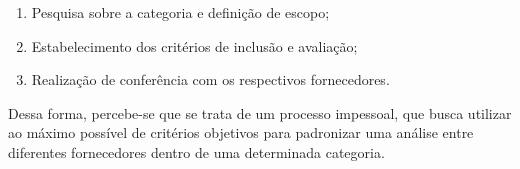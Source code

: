 \begin{enumerate}
    \item Pesquisa sobre a categoria e definição de escopo;
    \item Estabelecimento dos critérios de inclusão e avaliação;
    \item Realização de conferência com os respectivos fornecedores.
\end{enumerate}

Dessa forma, percebe-se que se trata de um processo impessoal, que busca utilizar ao máximo possível de critérios objetivos para padronizar uma análise entre diferentes fornecedores dentro de uma determinada categoria.
